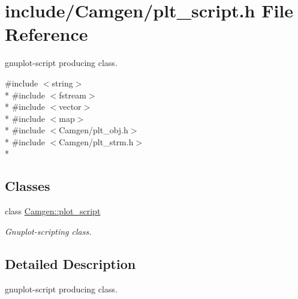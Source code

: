 \hypertarget{a00723}{}\section{include/\+Camgen/plt\+\_\+script.h File Reference}
\label{a00723}


gnuplot-\/script producing class.  


{\ttfamily \#include $<$string$>$}\\*
{\ttfamily \#include $<$fstream$>$}\\*
{\ttfamily \#include $<$vector$>$}\\*
{\ttfamily \#include $<$map$>$}\\*
{\ttfamily \#include $<$Camgen/plt\+\_\+obj.\+h$>$}\\*
{\ttfamily \#include $<$Camgen/plt\+\_\+strm.\+h$>$}\\*
\subsection*{Classes}
\begin{DoxyCompactItemize}
\item 
class \hyperlink{a00431}{Camgen\+::plot\+\_\+script}
\begin{DoxyCompactList}\small\item\em Gnuplot-\/scripting class. \end{DoxyCompactList}\end{DoxyCompactItemize}


\subsection{Detailed Description}
gnuplot-\/script producing class. 

